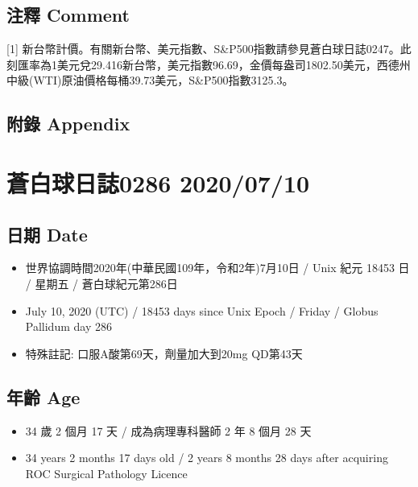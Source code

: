 \documentclass[
]{article}
\providecommand{\tightlist}{%
  \setlength{\itemsep}{0pt}\setlength{\parskip}{0pt}}
\begin{document}
\hypertarget{ux6ce8ux91cb-comment-8}{%
\subsection{注釋 Comment}\label{ux6ce8ux91cb-comment-8}}

{[}1{]}
新台幣計價。有關新台幣、美元指數、S\&P500指數請參見蒼白球日誌0247。此刻匯率為1美元兌29.416新台幣，美元指數96.69，金價每盎司1802.50美元，西德州中級(WTI)原油價格每桶39.73美元，S\&P500指數3125.3。

\hypertarget{ux9644ux9304-appendix-8}{%
\subsection{附錄 Appendix}\label{ux9644ux9304-appendix-8}}

\hypertarget{ux84bcux767dux7403ux65e5ux8a8c0286-20200710}{%
\section{蒼白球日誌0286
2020/07/10}\label{ux84bcux767dux7403ux65e5ux8a8c0286-20200710}}

\hypertarget{ux65e5ux671f-date-9}{%
\subsection{日期 Date}\label{ux65e5ux671f-date-9}}

\begin{itemize}
\tightlist
\item
  世界協調時間2020年(中華民國109年，令和2年)7月10日 / Unix 紀元 18453 日
  / 星期五 / 蒼白球紀元第286日
\item
  July 10, 2020 (UTC) / 18453 days since Unix Epoch / Friday / Globus
  Pallidum day 286
\item
  特殊註記: 口服A酸第69天，劑量加大到20mg QD第43天
\end{itemize}

\hypertarget{ux5e74ux9f61-age-9}{%
\subsection{年齡 Age}\label{ux5e74ux9f61-age-9}}

\begin{itemize}
\tightlist
\item
  34 歲 2 個月 17 天 / 成為病理專科醫師 2 年 8 個月 28 天
\item
  34 years 2 months 17 days old / 2 years 8 months 28 days after
  acquiring ROC Surgical Pathology Licence
\end{itemize}
\end{document}
